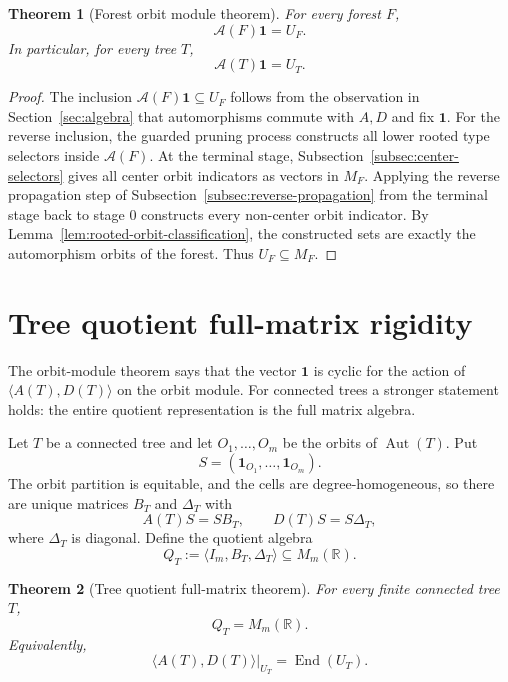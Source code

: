 \documentclass[a4paper,fleqn]{cas-sc}
\newtheorem{theorem}{Theorem}[section]
\theoremstyle{definition}
\theoremstyle{remark}
\newcommand{\R}{\mathbb R}
\newcommand{\one}{\mathbf 1}
\newcommand{\Aalg}{\mathcal A}
\newcommand{\Aut}{\operatorname{Aut}}
\newcommand{\End}{\operatorname{End}}
\begin{document}
\begin{theorem}[Forest orbit module theorem]
\label{thm:forest-module}
For every forest \(F\),
\[
        \Aalg(F)\one=U_F.
\]
In particular, for every tree \(T\),
\[
        \Aalg(T)\one=U_T.
\]
\end{theorem}

\begin{proof}
The inclusion \(\Aalg(F)\one\subseteq U_F\) follows from the observation in Section~\ref{sec:algebra} that automorphisms commute with \(A,D\) and fix \(\one\).
For the reverse inclusion, the guarded pruning process constructs all lower
rooted type selectors inside \(\Aalg(F)\).  At the terminal stage,
Subsection~\ref{subsec:center-selectors} gives all center orbit indicators as vectors in
\(M_F\).  Applying the reverse propagation step of
Subsection~\ref{subsec:reverse-propagation} from the terminal stage back to stage \(0\)
constructs every non-center orbit indicator.  By
Lemma~\ref{lem:rooted-orbit-classification}, the constructed sets are exactly the
automorphism orbits of the forest.  Thus \(U_F\subseteq M_F\).
\end{proof}


\section{Tree quotient full-matrix rigidity}
\label{sec:tree-quotient-full-matrix}

The orbit-module theorem says that the vector \(\one\) is cyclic for the action of
\(\langle A(T),D(T)\rangle\) on the orbit module.  For connected trees a stronger
statement holds: the entire quotient representation is the full matrix algebra.


Let \(T\) be a connected tree and let \(O_1,\ldots,O_m\) be the orbits of
\(\Aut(T)\).  Put
\[
        S=(\one_{O_1},\ldots,\one_{O_m}).
\]
The orbit partition is equitable, and the cells are degree-homogeneous, so there
are unique matrices \(B_T\) and \(\Delta_T\) with
\[
        A(T)S=SB_T,\qquad D(T)S=S\Delta_T,
\]
where \(\Delta_T\) is diagonal.  Define the quotient algebra
\[
        Q_T:=\langle I_m,B_T,\Delta_T\rangle\subseteq M_m(\R).
\]

\begin{theorem}[Tree quotient full-matrix theorem]
\label{thm:tree-quotient-full-matrix}
For every finite connected tree \(T\),
\[
        Q_T=M_m(\R).
\]
Equivalently,
\[
        \langle A(T),D(T)\rangle|_{U_T}=\End(U_T).
\]
\end{theorem}
\end{document}
